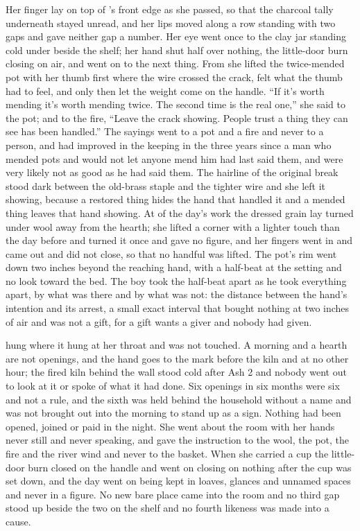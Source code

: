 Her finger lay on top of 's front edge as she passed, so that the charcoal tally underneath stayed unread, and her lips moved along a row standing with two gaps and gave neither gap a number. Her eye went once to the clay jar standing cold under  beside the shelf; her hand shut half over nothing, the little-door burn closing on air, and went on to the next thing. From  she lifted the twice-mended pot with her thumb first where the wire crossed the crack, felt what the thumb had to feel, and only then let the weight come on the handle. “If it's worth mending it's worth mending twice. The second time is the real one,” she said to the pot; and to the fire, “Leave the crack showing. People trust a thing they can see has been handled.” The sayings went to a pot and a fire and never to a person, and had improved in the keeping in the three years since a man who mended pots and would not let anyone mend him had last said them, and were very likely not as good as he had said them. The hairline of the original break stood dark between the old-brass staple and the tighter wire and she left it showing, because a restored thing hides the hand that handled it and a mended thing leaves that hand showing. At  of the day's work the dressed grain lay turned under wool away from the hearth; she lifted a corner with a lighter touch than the day before and turned it once and gave no figure, and her fingers went in and came out and did not close, so that no handful was lifted. The pot's rim went down two inches beyond the reaching hand, with a half-beat at the setting and no look toward the bed. The boy took the half-beat apart as he took everything apart, by what was there and by what was not: the distance between the hand's intention and its arrest, a small exact interval that bought nothing at two inches of air and was not a gift, for a gift wants a giver and nobody had given.

 hung where it hung at her throat and was not touched. A morning and a hearth are not openings, and the hand goes to the mark before the kiln and at no other hour; the fired kiln behind the wall stood cold after Ash 2 and nobody went out to look at it or spoke of what it had done. Six openings in six months were six and not a rule, and the sixth was held behind the household without a name and was not brought out into the morning to stand up as a sign. Nothing had been opened, joined or paid in the night. She went about the room with her hands never still and never speaking, and gave the instruction to the wool, the pot, the fire and the river wind and never to the basket. When she carried a cup the little-door burn closed on the handle and went on closing on nothing after the cup was set down, and the day went on being kept in loaves, glances and unnamed spaces and never in a figure. No new bare place came into the room and no third gap stood up beside the two on the shelf and no fourth likeness was made into a cause.

